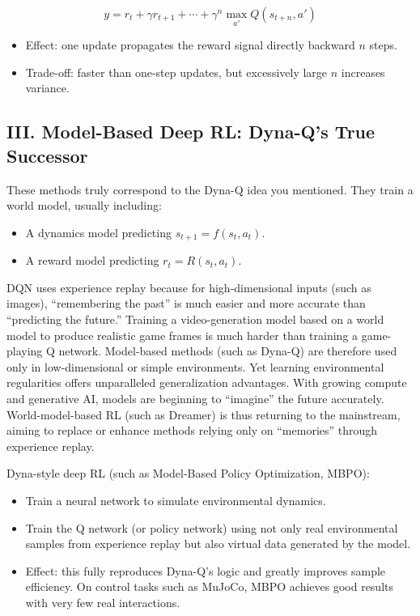 \[
y=r_t+\gamma r_{t+1}+\cdots+\gamma^{n}\max_{a'}Q(s_{t+n},a')
\]

\begin{itemize}
\tightlist
\item
  Effect: one update propagates the reward signal directly backward \(n\) steps.
\item
  Trade-off: faster than one-step updates, but excessively large \(n\) increases variance.
\end{itemize}

\hypertarget{iii.-model-based-deep-rl-dyna-qs-true-successor}{%
\subsection{III. Model-Based Deep RL: Dyna-Q's True Successor}\label{iii.-model-based-deep-rl-dyna-qs-true-successor}}

These methods truly correspond to the Dyna-Q idea you mentioned. They train a world model, usually including:

\begin{itemize}
\tightlist
\item
  A dynamics model predicting \(s_{t+1}=f(s_t,a_t)\).
\item
  A reward model predicting \(r_t=R(s_t,a_t)\).
\end{itemize}

DQN uses experience replay because for high-dimensional inputs (such as images), ``remembering the past'' is much easier and more accurate than ``predicting the future.'' Training a video-generation model based on a world model to produce realistic game frames is much harder than training a game-playing Q network. Model-based methods (such as Dyna-Q) are therefore used only in low-dimensional or simple environments. Yet learning environmental regularities offers unparalleled generalization advantages. With growing compute and generative AI, models are beginning to ``imagine'' the future accurately. World-model-based RL (such as Dreamer) is thus returning to the mainstream, aiming to replace or enhance methods relying only on ``memories'' through experience replay.

Dyna-style deep RL (such as Model-Based Policy Optimization, MBPO):

\begin{itemize}
\tightlist
\item
  Train a neural network to simulate environmental dynamics.
\item
  Train the Q network (or policy network) using not only real environmental samples from experience replay but also virtual data generated by the model.
\item
  Effect: this fully reproduces Dyna-Q's logic and greatly improves sample efficiency. On control tasks such as MuJoCo, MBPO achieves good results with very few real interactions.
\end{itemize}

